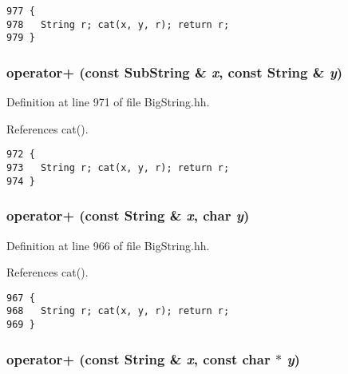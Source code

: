 \footnotesize\begin{verbatim}977 {
978   String r; cat(x, y, r); return r;
979 }
\end{verbatim}\normalsize 
{}
\subsubsection{ operator+ (const {\bf Sub\-String} \& {\em x}, const {\bf String} \& {\em y})\hspace{0.3cm}{\tt  [inline]}}\label{BigString_8hh_a74}




Definition at line 971 of file Big\-String.hh.

References cat().



\footnotesize\begin{verbatim}972 {
973   String r; cat(x, y, r); return r;
974 }
\end{verbatim}\normalsize 
{}
\subsubsection{ operator+ (const {\bf String} \& {\em x}, char {\em y})\hspace{0.3cm}{\tt  [inline]}}\label{BigString_8hh_a73}




Definition at line 966 of file Big\-String.hh.

References cat().



\footnotesize\begin{verbatim}967 {
968   String r; cat(x, y, r); return r;
969 }
\end{verbatim}\normalsize 
{}
\subsubsection{ operator+ (const {\bf String} \& {\em x}, const char $\ast$ {\em y})\hspace{0.3cm}{\tt  [inline]}}\label{BigString_8hh_a72}




